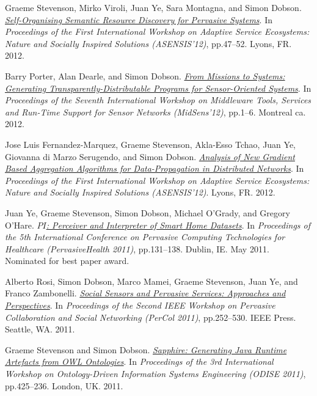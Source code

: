 \documentclass[11pt]{article}
\begin{document}
\label{orgf1eda33}Graeme Stevenson, Mirko Viroli, Juan Ye, Sara Montagna, and Simon Dobson.  \emph{\href{https://simondobson.org/softcopy/asensis-12-discovery.pdf}{Self-Organising Semantic Resource Discovery for Pervasive Systems}}. In \emph{Proceedings of the First International Workshop on Adaptive Service Ecosystems: Nature and Socially Inspired Solutions (ASENSIS’12)}, pp.47–52. Lyons, FR. 2012.

\label{org559e248}Barry Porter, Alan Dearle, and Simon Dobson.  \emph{\href{https://simondobson.org/softcopy/midsens12.pdf}{From Missions to Systems: Generating Transparently-Distributable Programs for Sensor-Oriented Systems}}. In \emph{Proceedings of the Seventh International Workshop on Middleware Tools, Services and Run-Time Support for Sensor Networks (MidSens’12)}, pp.1–6. Montreal ca. 2012.

\label{org0a9f72c}Jose Luis Fernandez-Marquez, Graeme Stevenson, Akla-Esso Tchao, Juan Ye, Giovanna di Marzo Serugendo, and Simon Dobson.  \emph{\href{https://simondobson.org/softcopy/asensis-12-gradients.pdf}{Analysis of New Gradient Based Aggregation Algorithms for Data-Propagation in Distributed Networks}}. In \emph{Proceedings of the First International Workshop on Adaptive Service Ecosystems: Nature and Socially Inspired Solutions (ASENSIS’12)}. Lyons, FR. 2012.

\label{org965ff4f}Juan Ye, Graeme Stevenson, Simon Dobson, Michael O’Grady, and Gregory O’Hare.  \emph{\href{https://simondobson.org/softcopy/pi-11.pdf}{\(PI\): Perceiver and Interpreter of Smart Home Datasets}}. In \emph{Proceedings of the 5th International Conference on Pervasive Computing Technologies for Healthcare (PervasiveHealth 2011)}, pp.131–138. Dublin, IE. May 2011. Nominated for best paper award.

\label{orgf4dfb87}Alberto Rosi, Simon Dobson, Marco Mamei, Graeme Stevenson, Juan Ye, and Franco Zambonelli.  \emph{\href{https://simondobson.org/softcopy/social-sensing-11.pdf}{Social Sensors and Pervasive Services: Approaches and Perspectives}}. In \emph{Proceedings of the Second IEEE Workshop on Pervasive Collaboration and Social Networking (PerCol 2011)}, pp.252–530. IEEE Press. Seattle, WA. 2011.

\label{org1de4f5e}Graeme Stevenson and Simon Dobson.  \emph{\href{https://simondobson.org/softcopy/sapphire-odise11.pdf}{Sapphire: Generating Java Runtime Artefacts from OWL Ontologies}}. In \emph{Proceedings of the 3rd International Workshop on Ontology-Driven Information Systems Engineering (ODISE 2011)}, pp.425–236. London, UK. 2011.
\end{document}
